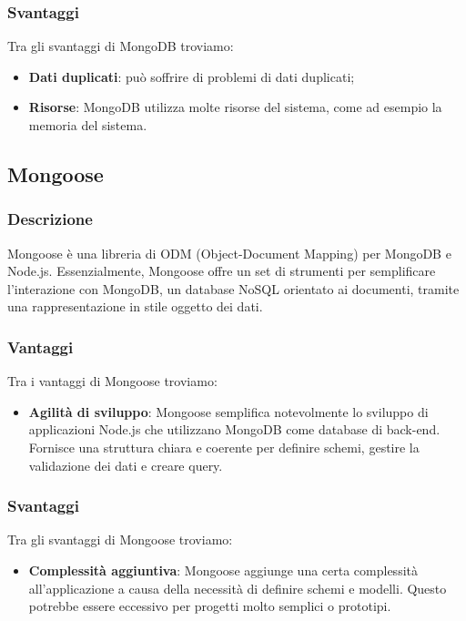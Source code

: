 \subsubsection*{Svantaggi}
Tra gli svantaggi di MongoDB troviamo:
\begin{itemize}
    \item \textbf{Dati duplicati}: può soffrire di problemi di dati duplicati;
    \item \textbf{Risorse}: MongoDB utilizza molte risorse del sistema, come ad esempio la memoria del sistema.
\end{itemize}


\subsection*{Mongoose}

\subsubsection*{Descrizione}
Mongoose è una libreria di ODM (Object-Document Mapping) per
MongoDB e Node.js. Essenzialmente, Mongoose offre un set di strumenti
per semplificare l'interazione con MongoDB, un database NoSQL orientato
ai documenti, tramite una rappresentazione in stile oggetto dei dati.

\subsubsection*{Vantaggi}
Tra i vantaggi di Mongoose troviamo:
\begin{itemize}
    \item \textbf{Agilità di sviluppo}: Mongoose semplifica notevolmente lo sviluppo di applicazioni Node.js che utilizzano MongoDB come database di back-end. Fornisce una struttura chiara e coerente per definire schemi, gestire la validazione dei dati e creare query.
\end{itemize}

\subsubsection*{Svantaggi}
Tra gli svantaggi di Mongoose troviamo:
\begin{itemize}
    \item \textbf{Complessità aggiuntiva}: Mongoose aggiunge una certa complessità all'applicazione a causa della necessità di definire schemi e modelli. Questo potrebbe essere eccessivo per progetti molto semplici o prototipi.
\end{itemize}


